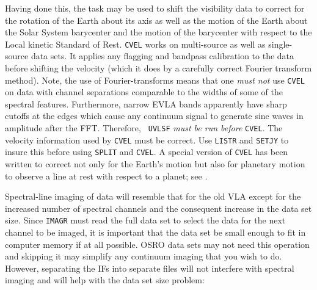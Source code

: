 Having done this, the task {\tt {}} may be used to shift
the visibility data to correct for the rotation of the Earth about its
axis as well as the motion of the Earth about the Solar System
barycenter and the motion of the barycenter with respect to the Local
kinetic Standard of Rest.  {\tt CVEL} works on multi-source as well as
single-source data sets.  It applies any flagging and bandpass
calibration to the data before shifting the velocity (which it does by
a carefully correct Fourier transform method).  Note, the use of
Fourier-transforms means that one {\it must not} use {\tt CVEL} on
data with channel separations comparable to the widths of some of the
spectral features.  Furthermore, narrow EVLA bands apparently have
sharp cutoffs at the edges which cause any continuum signal to
generate sine waves in amplitude after the FFT\@.  Therefore, {\tt
UVLSF} {\it must be run before} {\tt CVEL}\@.  The velocity
information used by {\tt CVEL} must be correct.  Use {\tt LISTR} and
{\tt SETJY} to insure this before using {\tt SPLIT} and {\tt CVEL}\@.
A special version of {\tt CVEL} has been written to correct not only
for the Earth's motion but also for planetary motion to observe a line
at rest with respect to a planet; see {\tt {}}\@.

Spectral-line imaging of  data will resemble that for the
old VLA except for the increased number of spectral channels and the
consequent increase in the data set size.  Since {\tt IMAGR} must read
the full data set to select the data for the next channel to be
imaged, it is important that the data set be small enough to fit in
computer memory if at all possible.  OSRO data sets may not need this
operation and skipping it may simplify any continuum imaging that you
wish to do.  However, separating the IFs into separate files will not
interfere with spectral imaging and will help with the data set size
problem:

